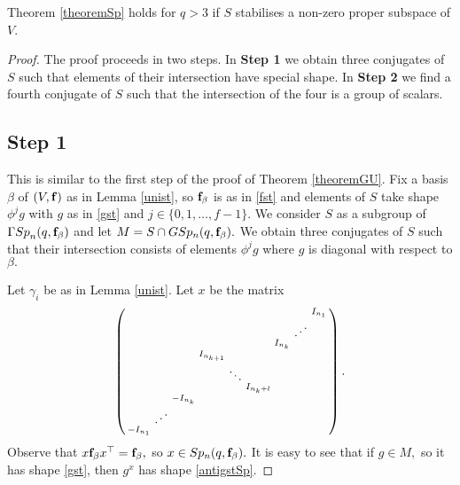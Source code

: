 \begin{Th}
\label{Spqgt3}
Theorem {\rm \ref{theoremSp}} holds for $q > 3$ if $S$ stabilises a non-zero proper subspace of $V$. 
\end{Th}
\begin{proof} The proof proceeds in two steps. In {\bf Step 1} we obtain three conjugates of $S$ such that elements of their intersection have special shape. In {\bf Step 2} we find a fourth conjugate of $S$ such that the intersection of the four is a group of scalars.

\subsection*{Step 1} This is similar to the first step of the proof of Theorem \ref{theoremGU}. Fix a basis $\beta$ of  $(V, {\bf f})$ as in Lemma \ref{unist}, so ${\bf f}_{\beta}$ is as in \eqref{fst} and elements of $S$ take shape $\phi^j g$ with $g$ as in \eqref{gst} and $j \in \{0,1, \ldots, f-1\}$. We consider $S$ as a subgroup of ${{\Gamma Sp}}_n(q,{\bf f}_{\beta})$ and  let $M=S \cap GSp_n(q,{\bf f}_{\beta}).$ We obtain three conjugates of $S$ such that their intersection consists of elements $\phi^j g$ where $g$ is diagonal with respect to $\beta.$




Let $\gamma_i$ be as in Lemma \ref{unist}.
Let $x$ be the matrix 
\begin{equation}\label{exSP}
 \left(
\begin{smallmatrix}
        & & & & & & &    & I_{n_1} \\
        & & & & & & &  \reflectbox{$\ddots$}  &\\
        & & & & & &I_{n_k} &    & \\
        & & &I_{n_{k+1}} & & & &    &\\ 
        & & & &\ddots & & &    &\\
        & & & & &I_{n_k+l} & &    &\\ 
        & &-I_{n_k} & & & & &    & \\
        &\reflectbox{$\ddots$} & & & & & &    &\\
-I_{n_1} & & & & & & &    & 
\end{smallmatrix} \right).
\end{equation}
Observe that $x{\bf f}_{\beta}{x}^{\top}={\bf f}_{\beta},$ so $x \in Sp_n(q,{\bf f}_{\beta}).$ It is easy to see that if $g \in M,$ so it has shape \eqref{gst}, then $g^x$ has shape \eqref{antigstSp}.





\end{proof}
